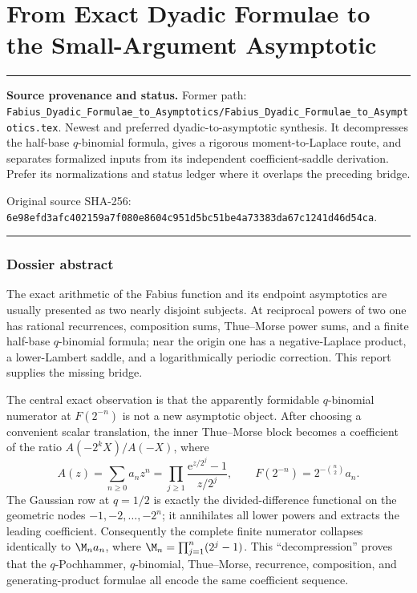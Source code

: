 \documentclass[11pt,oneside]{article}
\theoremstyle{definition}
\theoremstyle{remark}
\newcommand{\e}{\mathrm e}
\newenvironment{boxedremark}{%
  \par\smallskip\noindent\begin{center}\begin{minipage}{0.94\textwidth}%
  \color{black}\hrule\vspace{0.6em}\small
}{%
  \vspace{0.6em}\hrule\end{minipage}\end{center}\smallskip
}
\begin{document}
\clearpage
\part{From Exact Dyadic Formulae to the Small-Argument Asymptotic}
\label{part:dyadicasym}
\begin{boxedremark}
\textbf{Source provenance and status.} Former path: \nolinkurl{Fabius_Dyadic_Formulae_to_Asymptotics/Fabius_Dyadic_Formulae_to_Asymptotics.tex}.  Newest and preferred dyadic-to-asymptotic synthesis.  It decompresses the half-base \(q\)-binomial formula, gives a rigorous moment-to-Laplace route, and separates formalized inputs from its independent coefficient-saddle derivation.  Prefer its normalizations and status ledger where it overlaps the preceding bridge.\par\smallskip Original source SHA-256: \nolinkurl{6e98efd3afc402159a7f080e8604c951d5bc51be4a73383da67c1241d46d54ca}.
\end{boxedremark}
\section*{Dossier abstract}
The exact arithmetic of the Fabius function and its endpoint asymptotics are usually presented
as two nearly disjoint subjects.  At reciprocal powers of two one has rational recurrences,
composition sums, Thue--Morse power sums, and a finite half-base $q$-binomial formula; near the
origin one has a negative-Laplace product, a lower-Lambert saddle, and a logarithmically
periodic correction.  This report supplies the missing bridge.

The central exact observation is that the apparently formidable $q$-binomial numerator at
$F(2^{-n})$ is not a new asymptotic object.  After choosing a convenient scalar translation,
the inner Thue--Morse block becomes a coefficient of the ratio
$A(-2^kX)/A(-X)$, where
\[
 A(z)=\sum_{n\ge0}a_nz^n
     =\prod_{j\ge1}\frac{\e^{z/2^j}-1}{z/2^j},
 \qquad
 F(2^{-n})=2^{-\binom n2}a_n.
\]
The Gaussian row at $q=1/2$ is exactly the divided-difference functional on the geometric
nodes $-1,-2,\ldots,-2^n$; it annihilates all lower powers and extracts the leading
coefficient.  Consequently the complete finite numerator collapses identically to
$\M_na_n$, where $\M_n=\prod_{j=1}^n(2^j-1)$.  This ``decompression'' proves that the
$q$-Pochhammer, $q$-binomial, Thue--Morse, recurrence, composition, and generating-product
formulae all encode the same coefficient sequence.
\end{document}
